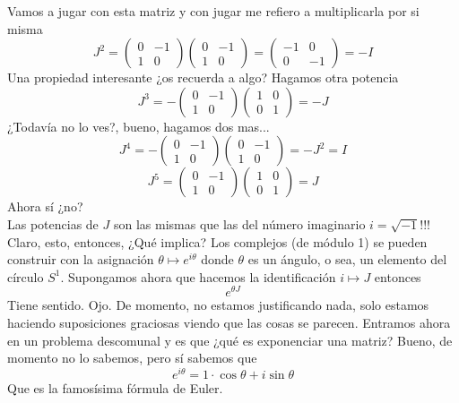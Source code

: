 \documentclass[12pt]{article}
\begin{document}
Vamos a jugar con esta matriz y con jugar me refiero a multiplicarla por si misma
\begin{equation*}
J^2=
\begin{pmatrix}
        0 & -1 \\ 1 & 0
    \end{pmatrix}
    \begin{pmatrix}
        0 & -1 \\ 1 & 0
    \end{pmatrix}
    = \begin{pmatrix}
        -1  & 0 \\ 0 & -1 
    \end{pmatrix} =- I
\end{equation*}
Una propiedad interesante ¿os recuerda a algo? Hagamos otra potencia
\begin{equation*}
J^3=-
\begin{pmatrix}
        0 & -1 \\ 1 & 0
    \end{pmatrix}
    \begin{pmatrix}
        1 & 0 \\ 0 & 1
    \end{pmatrix}
    =-J
\end{equation*}
¿Todavía no lo ves?, bueno, hagamos dos mas...
\begin{equation*}
J^4=-
\begin{pmatrix}
        0 & -1 \\ 1 & 0
    \end{pmatrix}\begin{pmatrix}
        0 & -1 \\ 1 & 0
    \end{pmatrix}
    = - J^2 = I 
\end{equation*}
\begin{equation*}
J^5=
\begin{pmatrix}
        0 & -1 \\ 1 & 0
    \end{pmatrix}\begin{pmatrix}
        1 & 0 \\ 0 & 1
    \end{pmatrix}
    = J 
\end{equation*}
Ahora sí ¿no? \\ Las potencias de $J$ son las mismas que las del número imaginario $i=\sqrt{-1}$!!!\\ 
Claro, esto, entonces, ¿Qué implica? Los complejos (de módulo 1) se pueden construir con la asignación $\theta \mapsto e^{i\theta} $ donde $\theta$ es un ángulo, o sea, un elemento del círculo $S^1$. Supongamos ahora que hacemos la identificación $i \mapsto J$ entonces 
$$e^{\theta J}$$
Tiene sentido. Ojo. De momento, no estamos justificando nada, solo estamos haciendo suposiciones graciosas viendo que las cosas se parecen. Entramos ahora en un problema descomunal y es que ¿qué es exponenciar una matriz? Bueno, de momento no lo sabemos, pero sí sabemos que
$$e^{i\theta} =1\cdot \cos\theta + i\sin\theta $$
Que es la famosísima fórmula de Euler. 
\end{document}
